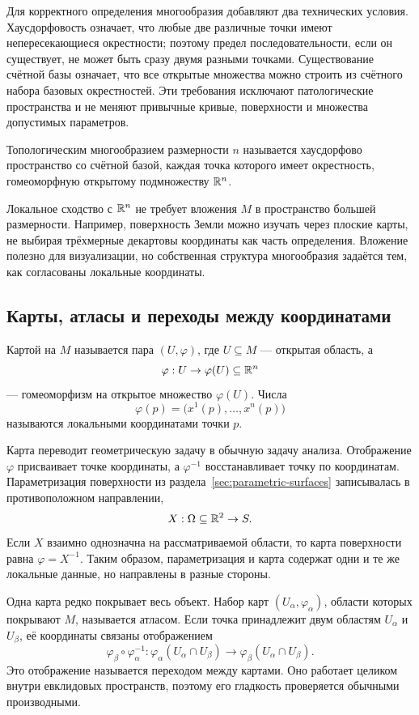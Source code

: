 Для корректного определения многообразия добавляют два технических условия. Хаусдорфовость означает, что любые две различные точки имеют непересекающиеся окрестности; поэтому предел последовательности, если он существует, не может быть сразу двумя разными точками. Существование счётной базы означает, что все открытые множества можно строить из счётного набора базовых окрестностей. Эти требования исключают патологические пространства и не меняют привычные кривые, поверхности и множества допустимых параметров.

\begin{definition}
Топологическим многообразием размерности \(n\) называется хаусдорфово пространство со счётной базой, каждая точка которого имеет окрестность, гомеоморфную открытому подмножеству \(\mathbb{R}^n\).
\end{definition}

Локальное сходство с \(\mathbb{R}^n\) не требует вложения \(M\) в пространство большей размерности. Например, поверхность Земли можно изучать через плоские карты, не выбирая трёхмерные декартовы координаты как часть определения. Вложение полезно для визуализации, но собственная структура многообразия задаётся тем, как согласованы локальные координаты.

\subsection{Карты, атласы и переходы между координатами}

\begin{definition}
Картой на \(M\) называется пара \((U,\varphi)\), где \(U\subseteq M\) --- открытая область, а
\[
\varphi:U\to \varphi(U)\subseteq\mathbb{R}^n
\]
--- гомеоморфизм на открытое множество \(\varphi(U)\). Числа
\[
\varphi(p)=\bigl(x^1(p),\ldots,x^n(p)\bigr)
\]
называются локальными координатами точки \(p\).
\end{definition}

Карта переводит геометрическую задачу в обычную задачу анализа. Отображение \(\varphi\) присваивает точке координаты, а \(\varphi^{-1}\) восстанавливает точку по координатам. Параметризация поверхности из раздела~\ref{sec:parametric-surfaces} записывалась в противоположном направлении,
\[
X:\Omega\subseteq\mathbb{R}^2\to S.
\]
Если \(X\) взаимно однозначна на рассматриваемой области, то карта поверхности равна \(\varphi=X^{-1}\). Таким образом, параметризация и карта содержат одни и те же локальные данные, но направлены в разные стороны.

Одна карта редко покрывает весь объект. Набор карт \((U_\alpha,\varphi_\alpha)\), области которых покрывают \(M\), называется атласом. Если точка принадлежит двум областям \(U_\alpha\) и \(U_\beta\), её координаты связаны отображением
\begin{equation}
\label{eq:manifold-transition-map}
\varphi_\beta\circ\varphi_\alpha^{-1}:
\varphi_\alpha(U_\alpha\cap U_\beta)
\longrightarrow
\varphi_\beta(U_\alpha\cap U_\beta).
\end{equation}
Это отображение называется переходом между картами. Оно работает целиком внутри евклидовых пространств, поэтому его гладкость проверяется обычными производными.


